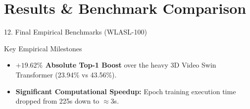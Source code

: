 \documentclass[aspectratio=169, 10pt]{beamer}
\begin{document}
\section{Results \& Benchmark Comparison}

\begin{frame}{12. Final Empirical Benchmarks (WLASL-100)}
  \begin{table}
    \centering
    \caption{Empirical Benchmark and Computational Efficiency Comparison on WLASL-100}
  \end{table}

  \begin{block}{Key Empirical Milestones}
    \begin{itemize}
      \item \textbf{$+19.62\%$ Absolute Top-1 Boost} over the heavy 3D Video Swin Transformer (23.94\% vs 43.56\%).
      \item \textbf{Significant Computational Speedup:} Epoch training execution time dropped from 225s down to $\approx 3$s.
    \end{itemize}
  \end{block}
\end{frame}
\end{document}

